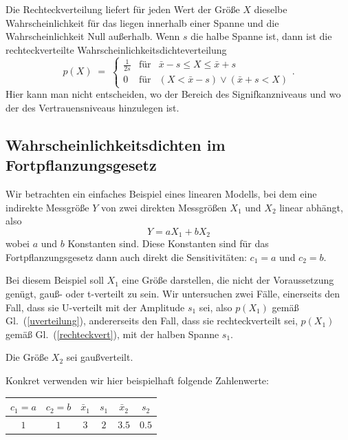 Die Rechteckverteilung liefert für jeden Wert der Größe $X$ dieselbe Wahrscheinlichkeit für
das liegen innerhalb einer Spanne und die Wahrscheinlichkeit Null außerhalb.
Wenn $s$ die halbe Spanne ist, dann ist die rechteckverteilte Wahrscheinlichkeitsdichteverteilung
\begin{equation}
p(X) \; = \; \left\{\begin{array}{lll}
\frac{1}{2 s} & \text{für} & \bar x - s  \leq X \leq \bar x + s\\
0 & \text{für} &  (X < \bar x - s) \vee (\bar x + s < X)
\end{array}\right. .
\label{rechteckvert}
\end{equation}
Hier kann man nicht entscheiden, wo der Bereich des Signifkanzniveaus und wo der des
Vertrauensniveaus hinzulegen ist.

\subsection{Wahrscheinlichkeitsdichten im Fortpflanzungsgesetz}
Wir betrachten ein einfaches Beispiel eines linearen Modells, bei dem eine
indirekte Messgröße $Y$ von zwei direkten Messgrößen $X_1$ und $X_2$ linear abhängt, also
\begin{equation}
Y = a X_1 + b X_2
\end{equation}
wobei $a$ und $b$ Konstanten sind. Diese Konstanten sind für das Fortpflanzungsgesetz
dann auch direkt die Sensitivitäten: $c_1 = a$ und $c_2 = b$.

Bei diesem Beispiel soll $X_1$ eine Größe darstellen, die nicht der Voraussetzung genügt, gauß- oder
t-verteilt zu sein. Wir untersuchen zwei Fälle, einerseits den Fall, dass sie U-verteilt mit
der Amplitude $s_1$ sei, also $p(X_1)$ gemäß Gl.~(\ref{uverteilung}), andererseits den Fall,
dass sie rechteckverteilt sei, $p(X_1)$ gemäß Gl.~(\ref{rechteckvert}), mit der halben Spanne $s_1$.

Die Größe $X_2$ sei gaußverteilt.

Konkret verwenden wir hier beispielhaft folgende Zahlenwerte:
\begin{center}
	\begin{tabular}{c|c||c|c||c|c}
		$c_1 = a$ & $c_2 = b$ & $\bar x_1$ & $s_1$ & $\bar x_2$ & $s_2$ \\
		\hline
		$1$ & $1$ & $3$ & $2$ & $3.5$ & $0.5$
	\end{tabular}
\end{center}

